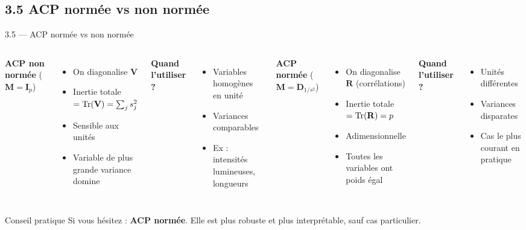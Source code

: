 \subsection{3.5 ACP normée vs non normée}
\begin{frame}{3.5 — ACP normée vs non normée}
\begin{columns}[T]
\textbf{ACP non normée} ($\mathbf{M} = \mathbf{I}_p$)
\begin{itemize}\small
  \item On diagonalise $\mathbf{V}$
  \item Inertie totale $= \operatorname{Tr}(\mathbf{V}) = \sum_j s_j^2$
  \item Sensible aux \alert{unités}
  \item Variable de plus grande variance domine
\end{itemize}

\textbf{Quand l'utiliser ?}
\begin{itemize}\small
  \item Variables homogènes en unité
  \item Variances comparables
  \item Ex : intensités lumineuses, longueurs
\end{itemize}

\textbf{ACP normée} ($\mathbf{M} = \mathbf{D}_{1/s^2}$)
\begin{itemize}\small
  \item On diagonalise $\mathbf{R}$ (corrélations)
  \item Inertie totale $= \operatorname{Tr}(\mathbf{R}) = p$
  \item \alert{Adimensionnelle}
  \item Toutes les variables ont poids égal
\end{itemize}

\textbf{Quand l'utiliser ?}
\begin{itemize}\small
  \item Unités différentes
  \item Variances disparates
  \item Cas \alert{le plus courant} en pratique
\end{itemize}
\end{columns}

\vspace{0.2cm}
\begin{alertblock}{Conseil pratique}
\small Si vous hésitez : \textbf{ACP normée}. Elle est plus robuste et
plus interprétable, sauf cas particulier.
\end{alertblock}
\end{frame}

